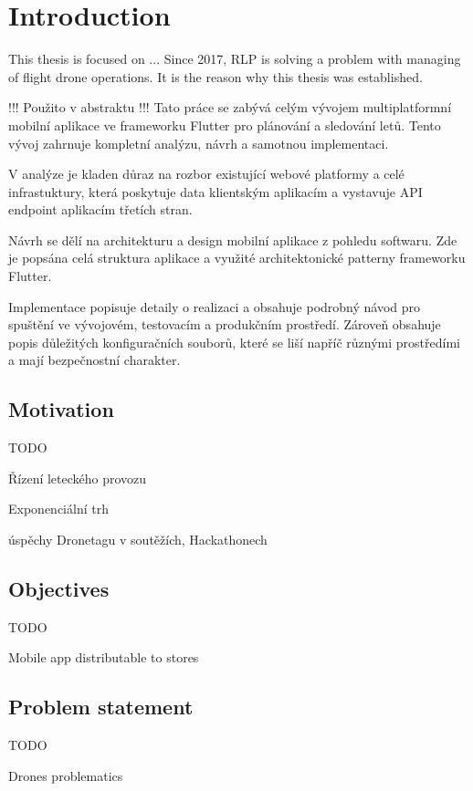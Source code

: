 \chapter{Introduction}\label{ch:introduction}
This thesis is focused on ...
Since 2017, RLP is solving a problem with managing of flight drone operations.
It is the reason why this thesis was established.

!!! Použito v abstraktu !!!
Tato práce se zabývá celým vývojem multiplatformní mobilní aplikace ve frameworku Flutter pro plánování a sledování letů.
Tento vývoj zahrnuje kompletní analýzu, návrh a samotnou implementaci.

V analýze je kladen důraz na rozbor existující webové platformy a celé infrastuktury, která poskytuje data klientským aplikacím a vystavuje API endpoint aplikacím třetích stran.

Návrh se dělí na architekturu a design mobilní aplikace z pohledu softwaru.
Zde je popsána celá struktura aplikace a využité architektonické patterny frameworku Flutter.

Implementace popisuje detaily o realizaci a obsahuje podrobný návod pro spuštění ve vývojovém, testovacím a produkčním prostředí.
Zároveň obsahuje popis důležitých konfiguračních souborů, které se liší napříč různými prostředími a mají bezpečnostní charakter.

\section{Motivation}\label{sec:motivation}
TODO

Řízení leteckého provozu

Exponenciální trh

úspěchy Dronetagu v soutěžích, Hackathonech


\section{Objectives}\label{sec:objectives}
TODO

Mobile app distributable to stores

\section{Problem statement}\label{sec:problem-statement}
TODO

Drones problematics
